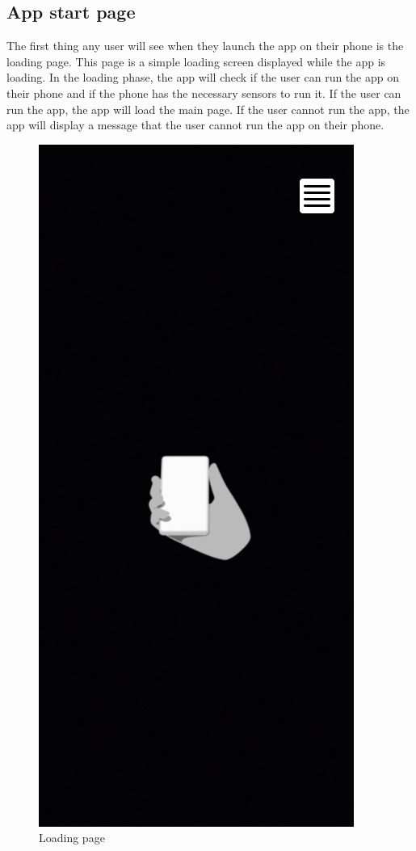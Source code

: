 \subsection{App start page}
The first thing any user will see when they launch the app on their phone is the loading page. This page is a simple loading screen displayed while the app is loading. In the loading phase, the app will check if the user can run the app on their phone and if the phone has the necessary sensors to run it. If the user can run the app, the app will load the main page. If the user cannot run the app, the app will display a message that the user cannot run the app on their phone.
\begin{figure}[h!]
    \begin{center}
        \includegraphics[scale=0.5]{img/App_mock/iPhone 14 - 1.png}
        \caption{Loading page}
        \label{fig:loading-page}
    \end{center}
\end{figure}
\pagebreak


